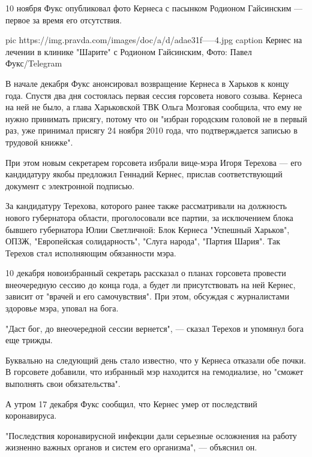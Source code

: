 10 ноября Фукс
опубликовал фото
Кернеса с пасынком Родионом Гайсинским — первое за время его отсутствия.

\ifcmt
pic https://img.pravda.com/images/doc/a/d/adae31f-----4.jpg
caption Кернес на лечении в клинике "Шарите" с Родионом Гайсинским, Фото: Павел Фукс/Telegram
\fi

В начале декабря Фукс анонсировал возвращение Кернеса в Харьков к концу года.
Спустя два дня состоялась первая сессия горсовета нового созыва. Кернеса на ней
не было, а глава Харьковской ТВК Ольга Мозговая сообщила, что ему не нужно
принимать присягу, потому что он "избран городским головой не в первый раз, уже
принимал присягу 24 ноября 2010 года, что подтверждается записью в трудовой
книжке". 

При этом новым секретарем горсовета избрали вице-мэра Игоря Терехова — его
кандидатуру якобы предложил Геннадий Кернес, прислав соответствующий документ с
электронной подписью. 

За кандидатуру Терехова, которого ранее также рассматривали на должность нового
губернатора области, проголосовали все партии, за исключением блока бывшего
губернатора Юлии Светличной: Блок Кернеса "Успешный Харьков", ОПЗЖ,
"Европейская солидарность", "Слуга народа", "Партия Шария". Так Терехов стал
исполняющим обязанности мэра.

10 декабря новоизбранный секретарь рассказал о планах горсовета провести
внеочередную сессию до конца года, а будет ли присутствовать на ней Кернес,
зависит от "врачей и его самочувствия". При этом, обсуждая с журналистами
здоровье мэра, уповал на бога.

"Даст бог, до внеочередной сессии вернется", — сказал Терехов и упомянул бога
еще трижды.

Буквально на следующий день стало известно, что у Кернеса отказали обе почки. В
горсовете добавили, что избранный мэр находится на гемодиализе, но "сможет
выполнять свои обязательства".

А утром 17 декабря Фукс сообщил, что Кернес умер от последствий коронавируса.

"Последствия коронавирусной инфекции дали серьезные осложнения на работу
жизненно важных органов и систем его организма", — объяснил он.


